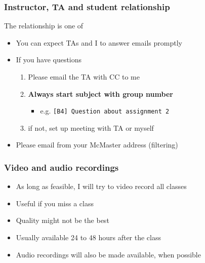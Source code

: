 \begin{frame}\frametitle{Instructor, TA and student relationship}
	\begin{exampleblock}{}
		The relationship is one of {}
	\end{exampleblock}

	\begin{itemize}
		\item	You can expect TAs and I to answer emails promptly

		\vspace{12pt}
		\item	If you have questions
			\begin{enumerate}
				\item	Please email the TA with CC to me \hfill {\tiny{\color{myOrange}{$\longleftarrow$ hopefully this solves your problem}}}
				\item	\textbf{Always start subject with group number}
				\begin{itemize}
					\item	e.g. \texttt{[B4] Question about assignment 2}
				\end{itemize}
				\item	if not, set up meeting with TA or myself
			\end{enumerate}
		\item	Please email from your McMaster address (filtering)
	\end{itemize}
\end{frame}

\begin{frame}\frametitle{Video and audio recordings}
	\begin{itemize}
		\item	As long as feasible, I will try to video record all classes
		\item	Useful if you miss a class
		\item	Quality might not be the best
		\item	Usually available 24 to 48 hours after the class
		\item	Audio recordings will also be made available, when possible
	\end{itemize}
\end{frame}

